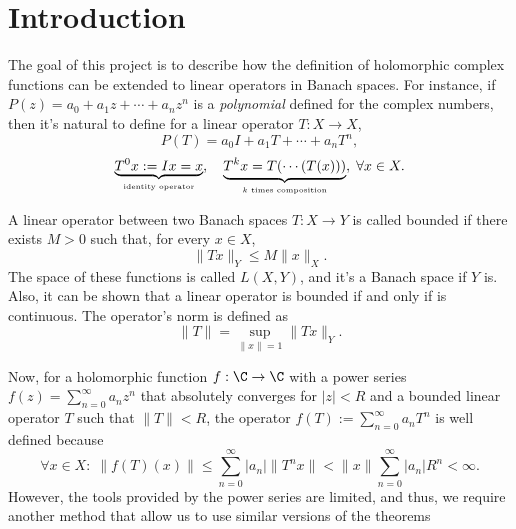 
\section{Introduction}

The goal of this project is to describe how the definition of holomorphic complex functions can be extended to linear operators in Banach spaces. For instance, if $P(z) = a_0 + a_1 z +\cdots + a_n z^n$ is a \textit{polynomial} defined for the complex numbers, then it's natural to define for a linear operator $T : X \to X$,
\[ P(T) = a_0 I + a_1 T + \cdots + a_n T^n, \]
\[ \underbrace{T^0 x := I x = x}_{\mbox{\tiny identity operator}},\quad \underbrace{T^k x = T(\cdots(T(x)))}_{\mbox{\tiny $k$ times composition}},\; \forall x \in X. \]

\begin{definition}\label{def:bounded_linear_operator}\label{def:operator_norm}
    A linear operator between two Banach spaces $T: X \to Y$ is called bounded if there exists $M > 0$ such that, for every $x \in X$,
    \[ \|Tx\|_Y \leq M \|x\|_X. \]
    The space of these functions is called $L(X,Y)$, and it's a Banach space if $Y$ is. Also, it can be shown that a linear operator is bounded if and only if is continuous. The operator's norm is defined as
    \[ \|T\| = \sup_{\|x\| = 1} \|Tx\|_Y. \]
\end{definition}

Now, for a holomorphic function $f: \C \to \C$ with a power series $f(z) = \sum_{n = 0}^{\infty} a_n z^n$ that absolutely converges for $|z| < R$ and a bounded linear operator $T$ such that $\|T\| < R$, the operator $f(T) := \sum_{n = 0}^{\infty} a_n T^n$ is well defined because
\[ \forall x \in X:\; \|f(T)(x)\| \leq \sum_{n = 0}^{\infty} |a_n| \|T^n x\| < \|x\| \sum_{n = 0}^{\infty} |a_n| R^n < \infty. \]
However, the tools provided by the power series are limited, and thus, we require another method that allow us to use similar versions of the theorems 

